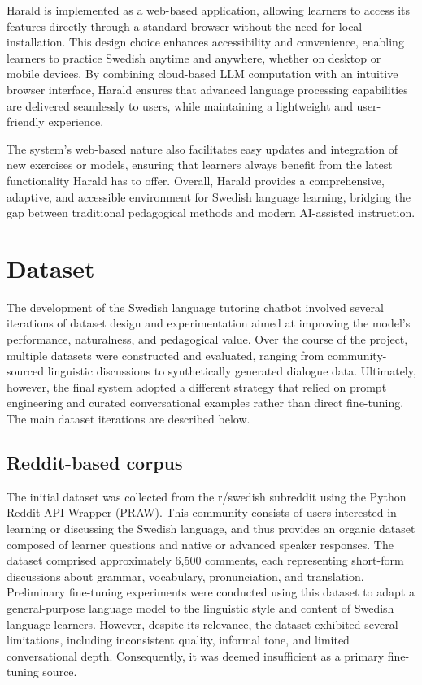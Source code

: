 \documentclass[a4paper,10pt]{article}
\begin{document}
Harald is implemented as a web-based application, allowing learners to access its features directly through a standard browser without the need for local installation. This design choice enhances accessibility and convenience, enabling learners to practice Swedish anytime and anywhere, whether on desktop or mobile devices. By combining cloud-based LLM computation with an intuitive browser interface, Harald ensures that advanced language processing capabilities are delivered seamlessly to users, while maintaining a lightweight and user-friendly experience.

The system’s web-based nature also facilitates easy updates and integration of new exercises or models, ensuring that learners always benefit from the latest functionality Harald has to offer. Overall, Harald provides a comprehensive, adaptive, and accessible environment for Swedish language learning, bridging the gap between traditional pedagogical methods and modern AI-assisted instruction.

\section{Dataset}

The development of the Swedish language tutoring chatbot involved several iterations of dataset design and experimentation aimed at improving the model’s performance, naturalness, and pedagogical value. Over the course of the project, multiple datasets were constructed and evaluated, ranging from community-sourced linguistic discussions to synthetically generated dialogue data. Ultimately, however, the final system adopted a different strategy that relied on prompt engineering and curated conversational examples rather than direct fine-tuning. The main dataset iterations are described below.

\subsection{Reddit-based corpus}
The initial dataset was collected from the r/swedish subreddit using the Python Reddit API Wrapper (PRAW). This community consists of users interested in learning or discussing the Swedish language, and thus provides an organic dataset composed of learner questions and native or advanced speaker responses. The dataset comprised approximately 6,500 comments, each representing short-form discussions about grammar, vocabulary, pronunciation, and translation. Preliminary fine-tuning experiments were conducted using this dataset to adapt a general-purpose language model to the linguistic style and content of Swedish language learners. However, despite its relevance, the dataset exhibited several limitations, including inconsistent quality, informal tone, and limited conversational depth. Consequently, it was deemed insufficient as a primary fine-tuning source.
\end{document}
